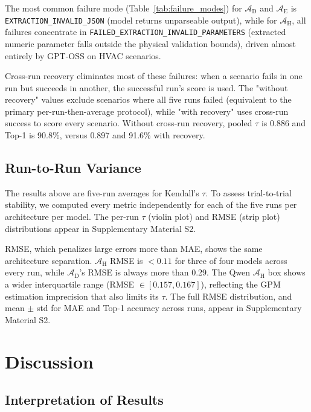 \documentclass[a4paper,fleqn]{cas-dc}
\begin{document}
The most common failure mode (Table~\ref{tab:failure_modes}) for $\mathcal{A}_{\text{D}}$ and $\mathcal{A}_{\text{E}}$ is \texttt{EXTRACTION\_INVALID\_\allowbreak JSON} (model returns unparseable output), while for $\mathcal{A}_{\text{H}}$, all failures concentrate in \texttt{FAILED\_EXTRACTION\_\allowbreak INVALID\_\allowbreak PARAMETERS} (extracted numeric parameter falls outside the physical validation bounds), driven almost entirely by GPT-OSS on HVAC scenarios.

Cross-run recovery eliminates most of these failures: when a scenario fails in one run but succeeds in another, the successful run's score is used. The "without recovery" values exclude scenarios where all five runs failed (equivalent to the primary per-run-then-average protocol), while "with recovery" uses cross-run success to score every scenario. Without cross-run recovery, pooled $\tau$ is 0.886 and Top-1 is 90.8\%, versus 0.897 and 91.6\% with recovery.



\FloatBarrier
\subsection{Run-to-Run Variance}
\label{sec:res-variance}

The results above are five-run averages for Kendall's $\tau$. To assess trial-to-trial stability, we computed every metric independently for each of the five runs per architecture per model. The per-run $\tau$ (violin plot) and RMSE (strip plot) distributions appear in Supplementary Material S2.
\FloatBarrier

RMSE, which penalizes large errors more than MAE, shows the same architecture separation. $\mathcal{A}_{\text{H}}$ RMSE is $< 0.11$ for three of four models across every run, while $\mathcal{A}_{\text{D}}$'s RMSE is always more than 0.29. The Qwen $\mathcal{A}_{\text{H}}$ box shows a wider interquartile range (RMSE $\in [0.157, 0.167]$), reflecting the GPM estimation imprecision that also limits its $\tau$. The full RMSE distribution, and mean $\pm$ std for MAE and Top-1 accuracy across runs, appear in Supplementary Material S2.


\FloatBarrier
\section{Discussion}
\label{sec:discussion}

\subsection{Interpretation of Results}
\label{sec:interpretation}
\end{document}
